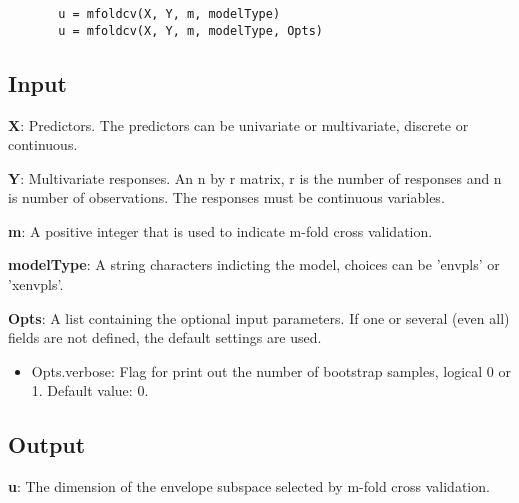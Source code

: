 \documentclass[a4paper,11pt,openany]{memoir}
\begin{document}
\begin{verbatim}       u = mfoldcv(X, Y, m, modelType)
       u = mfoldcv(X, Y, m, modelType, Opts)\end{verbatim}
    

\subsection*{Input}

\begin{par}
\textbf{X}: Predictors.  The predictors can be univariate or multivariate, discrete or continuous.
\end{par} \vspace{1em}
\begin{par}
\textbf{Y}: Multivariate responses. An n by r matrix, r is the number of responses and n is number of observations. The responses must be continuous variables.
\end{par} \vspace{1em}
\begin{par}
\textbf{m}: A positive integer that is used to indicate m-fold cross validation.
\end{par} \vspace{1em}
\begin{par}
\textbf{modelType}: A string characters indicting the model, choices can be 'envpls' or 'xenvpls'.
\end{par} \vspace{1em}
\begin{par}
\textbf{Opts}: A list containing the optional input parameters. If one or several (even all) fields are not defined, the default settings are used.
\end{par} \vspace{1em}
\begin{itemize}
\setlength{\itemsep}{-1ex}
   \item Opts.verbose: Flag for print out the number of bootstrap samples, logical 0 or 1. Default value: 0.
\end{itemize}


\subsection*{Output}

\begin{par}
\textbf{u}: The dimension of the envelope subspace selected by m-fold cross validation.
\end{par} \vspace{1em}
    
\end{document}
